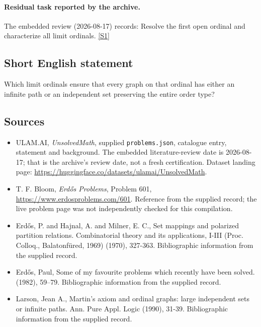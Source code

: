 \documentclass[11pt,a4paper]{article}
\newcommand{\sref}[2]{\hyperlink{source:#1:#2}{[S#2]}}
\begin{document}
\paragraph{Residual task reported by the archive.}

The embedded review (2026-08-17) records: Resolve the first open ordinal and characterize all limit ordinals. \sref{statement}{1}

\subsection{Short English statement}

Which limit ordinals ensure that every graph on that ordinal has either an infinite path or an independent set preserving the entire order type?

\subsection{Sources}

{\small

\begin{itemize}

\item[\hypertarget{source:statement:1}{S1}] ULAM.AI, \emph{UnsolvedMath}, supplied \texttt{problems.json}, catalogue entry, statement and background. The embedded literature-review date is 2026-08-17; that is the archive’s review date, not a fresh certification. Dataset landing page: \url{https://huggingface.co/datasets/ulamai/UnsolvedMath}.

\item[\hypertarget{source:statement:2}{S2}] T. F. Bloom, \emph{Erdős Problems}, Problem 601, \url{https://www.erdosproblems.com/601}. Reference from the supplied record; the live problem page was not independently checked for this compilation.

\item[\hypertarget{source:statement:3}{S3}] Erd\H{o}s, P. and Hajnal, A. and Milner, E. C., Set mappings and polarized partition relations. Combinatorial theory and its applications, I-III (Proc. Colloq., Balatonf\"{u}red, 1969) (1970), 327-363. Bibliographic information from the supplied record.

\item[\hypertarget{source:statement:4}{S4}] Erd\H{o}s, Paul, Some of my favourite problems which recently have been solved. (1982), 59--79. Bibliographic information from the supplied record.

\item[\hypertarget{source:statement:5}{S5}] Larson, Jean A., Martin's axiom and ordinal graphs: large independent sets or infinite paths. Ann. Pure Appl. Logic (1990), 31-39. Bibliographic information from the supplied record.

\end{itemize}

}

\label{end:statement}
\end{document}
